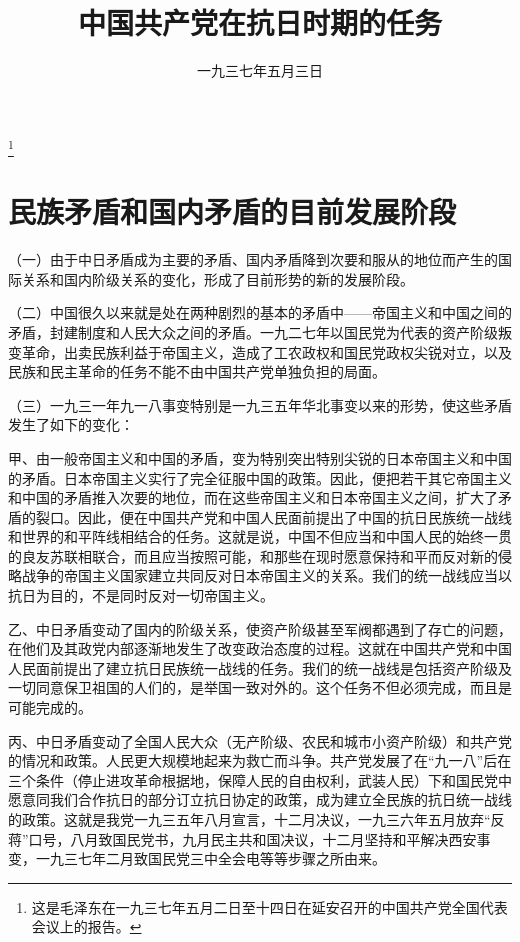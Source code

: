 

\title{中国共产党在抗日时期的任务}
\date{一九三七年五月三日}
\thanks{这是毛泽东在一九三七年五月二日至十四日在延安召开的中国共产党全国代表会议上的报告。}
\maketitle


\section{民族矛盾和国内矛盾的目前发展阶段}

（一）由于中日矛盾成为主要的矛盾、国内矛盾降到次要和服从的地位而产生的国际关系和国内阶级关系的变化，形成了目前形势的新的发展阶段。

（二）中国很久以来就是处在两种剧烈的基本的矛盾中——帝国主义和中国之间的矛盾，封建制度和人民大众之间的矛盾。一九二七年以国民党为代表的资产阶级叛变革命，出卖民族利益于帝国主义，造成了工农政权和国民党政权尖锐对立，以及民族和民主革命的任务不能不由中国共产党单独负担的局面。

（三）一九三一年九一八事变特别是一九三五年华北事变以来的形势，使这些矛盾发生了如下的变化：

甲、由一般帝国主义和中国的矛盾，变为特别突出特别尖锐的日本帝国主义和中国的矛盾。日本帝国主义实行了完全征服中国的政策。因此，便把若干其它帝国主义和中国的矛盾推入次要的地位，而在这些帝国主义和日本帝国主义之间，扩大了矛盾的裂口。因此，便在中国共产党和中国人民面前提出了中国的抗日民族统一战线和世界的和平阵线相结合的任务。这就是说，中国不但应当和中国人民的始终一贯的良友苏联相联合，而且应当按照可能，和那些在现时愿意保持和平而反对新的侵略战争的帝国主义国家建立共同反对日本帝国主义的关系。我们的统一战线应当以抗日为目的，不是同时反对一切帝国主义。

乙、中日矛盾变动了国内的阶级关系，使资产阶级甚至军阀都遇到了存亡的问题，在他们及其政党内部逐渐地发生了改变政治态度的过程。这就在中国共产党和中国人民面前提出了建立抗日民族统一战线的任务。我们的统一战线是包括资产阶级及一切同意保卫祖国的人们的，是举国一致对外的。这个任务不但必须完成，而且是可能完成的。

丙、中日矛盾变动了全国人民大众（无产阶级、农民和城市小资产阶级）和共产党的情况和政策。人民更大规模地起来为救亡而斗争。共产党发展了在“九一八”后在三个条件（停止进攻革命根据地，保障人民的自由权利，武装人民）下和国民党中愿意同我们合作抗日的部分订立抗日协定的政策，成为建立全民族的抗日统一战线的政策。这就是我党一九三五年八月宣言，十二月决议，一九三六年五月放弃“反蒋”口号，八月致国民党书，九月民主共和国决议，十二月坚持和平解决西安事变，一九三七年二月致国民党三中全会电等等步骤之所由来。

